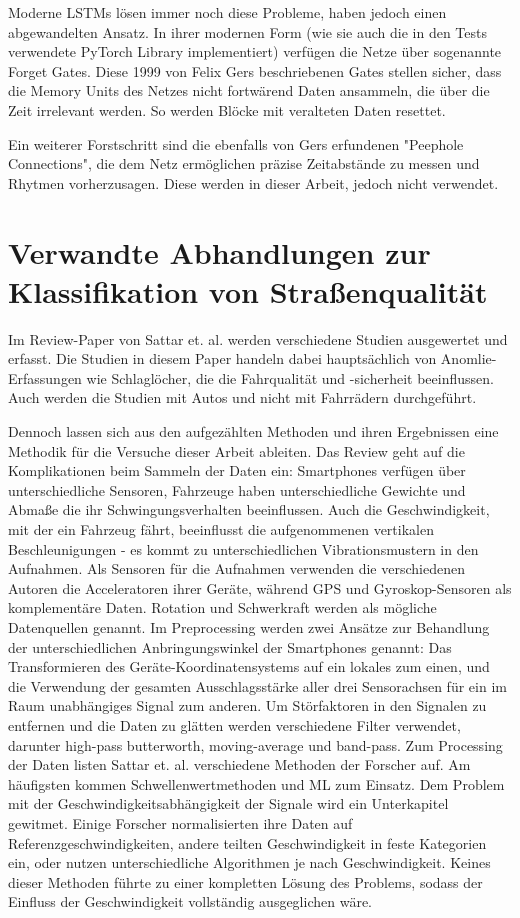 Moderne LSTMs lösen immer noch diese Probleme, haben jedoch einen abgewandelten Ansatz. In ihrer modernen Form (wie sie auch die in den Tests verwendete PyTorch Library implementiert) verfügen die Netze über sogenannte Forget Gates. Diese 1999 von Felix Gers beschriebenen Gates stellen sicher, dass die Memory Units des Netzes nicht fortwärend Daten ansammeln, die über die Zeit irrelevant werden. So werden Blöcke mit veralteten Daten resettet. \cite{Gers1999}

Ein weiterer Forstschritt sind die ebenfalls von Gers erfundenen "Peephole Connections", die dem Netz ermöglichen präzise Zeitabstände zu messen und Rhytmen vorherzusagen. \cite{Gers2000} Diese werden in dieser Arbeit, jedoch nicht verwendet.

\section{Verwandte Abhandlungen zur Klassifikation von Straßenqualität}
Im Review-Paper von Sattar et. al. werden verschiedene Studien ausgewertet und erfasst. Die Studien in diesem Paper handeln dabei hauptsächlich von Anomlie-Erfassungen wie Schlaglöcher, die die Fahrqualität und -sicherheit beeinflussen. Auch werden die Studien mit Autos und nicht mit Fahrrädern durchgeführt. \cite{Sattar2018} 

Dennoch lassen sich aus den aufgezählten Methoden und ihren Ergebnissen eine Methodik für die Versuche dieser Arbeit ableiten. Das Review geht auf die Komplikationen beim Sammeln der Daten ein: Smartphones verfügen über unterschiedliche Sensoren, Fahrzeuge haben unterschiedliche Gewichte und Abmaße die ihr Schwingungsverhalten beeinflussen. Auch die Geschwindigkeit, mit der ein Fahrzeug fährt, beeinflusst die aufgenommenen vertikalen Beschleunigungen - es kommt zu unterschiedlichen Vibrationsmustern in den Aufnahmen. Als Sensoren für die Aufnahmen verwenden die verschiedenen Autoren die Acceleratoren ihrer Geräte, während GPS und Gyroskop-Sensoren als komplementäre Daten. Rotation und Schwerkraft werden als mögliche Datenquellen genannt. Im Preprocessing werden zwei Ansätze zur Behandlung der unterschiedlichen Anbringungswinkel der Smartphones genannt: Das Transformieren des Geräte-Koordinatensystems auf ein lokales zum einen, und die Verwendung der gesamten Ausschlagsstärke aller drei Sensorachsen für ein im Raum unabhängiges Signal zum anderen. Um Störfaktoren in den Signalen zu entfernen und die Daten zu glätten werden verschiedene Filter verwendet, darunter high-pass butterworth, moving-average und band-pass. Zum Processing der Daten listen Sattar et. al. verschiedene Methoden der Forscher auf. Am häufigsten kommen Schwellenwertmethoden und ML zum Einsatz. Dem Problem mit der Geschwindigkeitsabhängigkeit der Signale wird ein Unterkapitel gewitmet. Einige Forscher normalisierten ihre Daten auf Referenzgeschwindigkeiten, andere teilten Geschwindigkeit in feste Kategorien ein, oder nutzen unterschiedliche Algorithmen je nach Geschwindigkeit. Keines dieser Methoden führte zu einer kompletten Lösung des Problems, sodass der Einfluss der Geschwindigkeit vollständig ausgeglichen wäre. \cite{Sattar2018}

